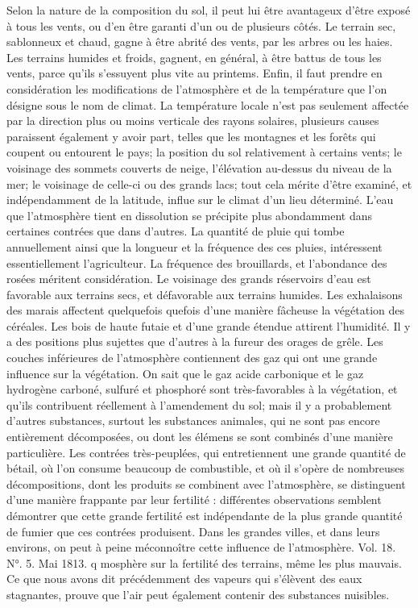 Selon la nature de la composition du sol, il peut lui être avantageux d'être exposé à tous les vents, ou d'en être garanti d'un ou de plusieurs côtés. Le terrain sec, sablonneux et chaud, gagne à être abrité des vents, par les arbres ou les haies. Les terrains humides et froids, gagnent, en général, à être battus de tous les vents, parce qu'ils s'essuyent plus vite au printems.\setcounter{page}{192} Enfin, il faut prendre en considération les modifications de l'atmosphère et de la température que l'on désigne sous le nom de climat.
La température locale n'est pas seulement affectée par la direction plus ou moins verticale des rayons solaires, plusieurs causes paraissent également y avoir part, telles que les montagnes et les forêts qui coupent ou entourent le pays; la position du sol relativement à certains vents; le voisinage des sommets couverts de neige, l'élévation au-dessus du niveau de la mer; le voisinage de celle-ci ou des grands lacs; tout cela mérite d'être examiné, et indépendamment de la latitude, influe sur le climat d'un lieu déterminé.
L'eau que l'atmosphère tient en dissolution se précipite plus abondamment dans certaines contrées que dans d'autres. La quantité de pluie qui tombe annuellement ainsi que la longueur et la fréquence des ces pluies, intéressent essentiellement l'agriculteur. La fréquence des brouillards, et l'abondance des rosées méritent considération.
Le voisinage des grands réservoirs d'eau est favorable aux terrains secs, et défavorable aux terrains humides.
Les exhalaisons des marais affectent quelquefois\setcounter{page}{193} quefois d'une manière fâcheuse la végétation des céréales. Les bois de haute futaie et d'une grande étendue attirent l'humidité. Il y a des positions plus sujettes que d'autres à la fureur des orages de grêle.
Les couches inférieures de l'atmosphère contiennent des gaz qui ont une grande influence sur la végétation. On sait que le gaz acide carbonique et le gaz hydrogène carboné, sulfuré et phosphoré sont très-favorables à la végétation, et qu'ils contribuent réellement à l'amendement du sol; mais il y a probablement d'autres substances, surtout les substances animales, qui ne sont pas encore entièrement décomposées, ou dont les élémens se sont combinés d'une manière particulière. Les contrées très-peuplées, qui entretiennent une grande quantité de bétail, où l'on consume beaucoup de combustible, et où il s'opère de nombreuses décompositions, dont les produits se combinent avec l'atmosphère, se distinguent d'une manière frappante par leur fertilité : différentes observations semblent démontrer que cette grande fertilité est indépendante de la plus grande quantité de fumier que ces contrées produisent. Dans les grandes villes, et dans leurs environs, on peut à peine méconnoître cette influence de l'atmosphère. Vol. 18. N°. 5. Mai 1813. q\setcounter{page}{194} mosphère sur la fertilité des terrains, même les plus mauvais. Ce que nous avons dit précédemment des vapeurs qui s'élèvent des eaux stagnantes, prouve que l'air peut également contenir des substances nuisibles.
